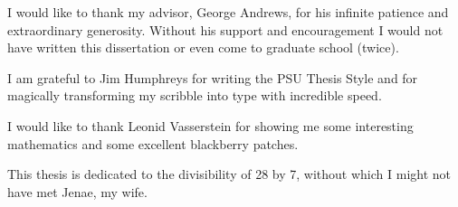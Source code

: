 \hyperdef{}

I would like to thank my advisor, George Andrews, for his infinite
patience and extraordinary generosity.  Without his support and
encouragement I would not have written this dissertation
or even come to graduate school (twice).

I am grateful to Jim Humphreys for writing the PSU Thesis Style
and for magically transforming my scribble into type with incredible
speed.

I would like to thank Leonid Vasserstein for showing me some
interesting mathematics and some excellent blackberry patches.

This thesis is dedicated to the divisibility of 28 by 7, without which I
might not have met Jenae, my wife.
